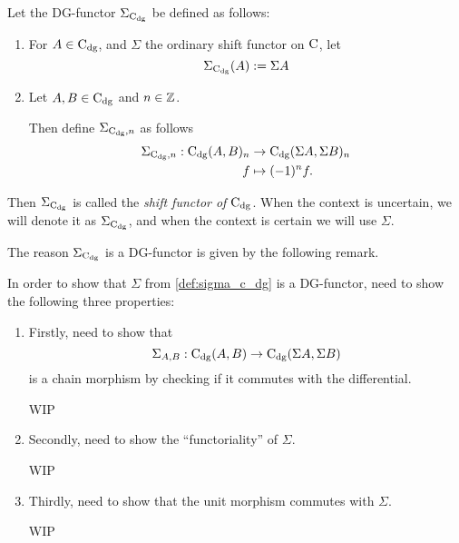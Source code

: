 \begin{definition}[Shift in \( \C_{\dg} \)]
    \label{def:sigma_c_dg}
    Let the DG-functor \( \Sigma_{\operatorname{C}_{\operatorname{dg}}} \) be defined as follows:
    \begin{enumerate}
        \item {
            For \( A \in \operatorname{C}_{\operatorname{dg}} \), and \( \Sigma \) the ordinary shift functor on \( \operatorname{C} \), let
            \[
                \Sigma_{\operatorname{C}_{\operatorname{dg}}}(A) := \Sigma A
            \]
        }
        \item {
            Let \( A, B \in \operatorname{C}_{\operatorname{dg}} \) and \( n \in {\mathbb{Z}} \).

            Then define \( \Sigma_{\operatorname{C}_{\operatorname{dg}}, n} \) as follows
            \begin{align*}
                \Sigma_{\operatorname{C}_{\operatorname{dg}}, n}: \operatorname{C}_{\operatorname{dg}}(A, B)_n &\to \operatorname{C}_{\operatorname{dg}}(\Sigma A, \Sigma B)_n \\
                f &\mapsto (-1)^n f.
            \end{align*}
        }
    \end{enumerate}
    Then \( \Sigma_{\operatorname{C}_{\operatorname{dg}}} \) is called the \emph{shift functor of \( \C_{\dg} \)}. When the context is uncertain, we will denote it as \( \Sigma_{\operatorname{C}_{\operatorname{dg}}} \), and when the context is certain we will use \( \Sigma \).
\end{definition}

The reason \( \Sigma_{\operatorname{C}_{\operatorname{dg}}} \) is a DG-functor is given by the following remark. 

\begin{remark}
    In order to show that \( \Sigma \) from \autoref{def:sigma_c_dg} is a DG-functor, need to show the following three properties:
    \begin{enumerate}
        \item {
            Firstly, need to show that
            \[
                \Sigma_{A, B}: \operatorname{C}_{\operatorname{dg}}(A, B) \to \operatorname{C}_{\operatorname{dg}}(\Sigma A, \Sigma B)
            \]
            is a chain morphism by checking if it commutes with the differential.

            WIP
        }
        \item {
            Secondly, need to show the ``functoriality'' of \( \Sigma \).

            WIP
        }
        \item {
            Thirdly, need to show that the unit morphism commutes with \( \Sigma \).

            WIP
        }
    \end{enumerate}
\end{remark}

